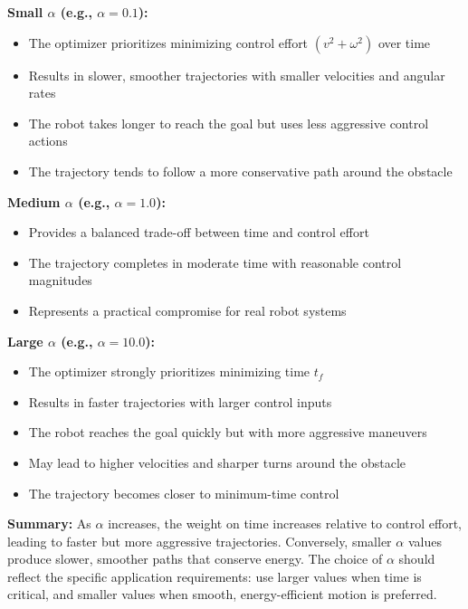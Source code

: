 \documentclass [11pt]{article}
\begin{document}
\begin{enumerate}[label=(\roman*)]
        \textbf{Small $\alpha$ (e.g., $\alpha = 0.1$):}
        \begin{itemize}
            \item The optimizer prioritizes minimizing control effort $(v^2 + \omega^2)$ over time
            \item Results in slower, smoother trajectories with smaller velocities and angular rates
            \item The robot takes longer to reach the goal but uses less aggressive control actions
            \item The trajectory tends to follow a more conservative path around the obstacle
        \end{itemize}

        \textbf{Medium $\alpha$ (e.g., $\alpha = 1.0$):}
        \begin{itemize}
            \item Provides a balanced trade-off between time and control effort
            \item The trajectory completes in moderate time with reasonable control magnitudes
            \item Represents a practical compromise for real robot systems
        \end{itemize}

        \textbf{Large $\alpha$ (e.g., $\alpha = 10.0$):}
        \begin{itemize}
            \item The optimizer strongly prioritizes minimizing time $t_f$
            \item Results in faster trajectories with larger control inputs
            \item The robot reaches the goal quickly but with more aggressive maneuvers
            \item May lead to higher velocities and sharper turns around the obstacle
            \item The trajectory becomes closer to minimum-time control
        \end{itemize}

        \textbf{Summary:} As $\alpha$ increases, the weight on time increases relative to control effort, leading to faster but more aggressive trajectories. Conversely, smaller $\alpha$ values produce slower, smoother paths that conserve energy. The choice of $\alpha$ should reflect the specific application requirements: use larger values when time is critical, and smaller values when smooth, energy-efficient motion is preferred.

    \end{enumerate}
\end{document}
